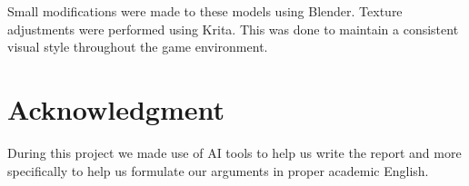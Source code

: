 \documentclass{article}
\begin{document}
Small modifications were made to these models using Blender. Texture adjustments were performed using Krita. This was done to maintain a consistent visual style throughout the game environment.

\section{Acknowledgment}
During this project we made use of AI tools to help us write the report and more
specifically to help us formulate our arguments in proper academic English.

% 
% 
\end{document}
